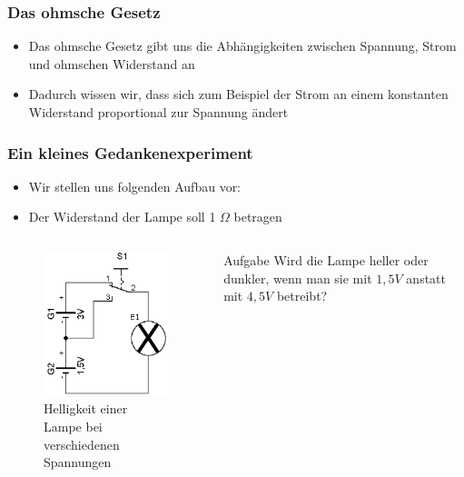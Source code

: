 \begin{frame}
  \frametitle{Das ohmsche Gesetz}
  \begin{itemize}
    \item Das ohmsche Gesetz gibt uns die Abhängigkeiten zwischen Spannung, Strom und ohmschen Widerstand an
    \item Dadurch wissen wir, dass sich zum Beispiel der Strom an einem konstanten Widerstand proportional zur Spannung ändert
  \end{itemize}
\end{frame}

\begin{frame}
  \frametitle{Ein kleines Gedankenexperiment}
  \begin{itemize}
    \item Wir stellen uns folgenden Aufbau vor:
    \item Der Widerstand der Lampe soll 1 $\Omega$ betragen
  \end{itemize}
  \begin{columns}
    \begin{center}
      \begin{figure}
        \includegraphics[width=\textwidth,height=.6\textheight,keepaspectratio]{e03/Strom_Spannung_Abh.png}
        \caption{Helligkeit einer Lampe bei verschiedenen Spannungen}
      \end{figure}
    \end{center}
    \begin{exampleblock}{Aufgabe}
      Wird die Lampe heller oder dunkler, wenn man sie mit $1,5 V$ anstatt mit $4,5 V$ betreibt?
    \end{exampleblock}
  \end{columns}
\end{frame}

